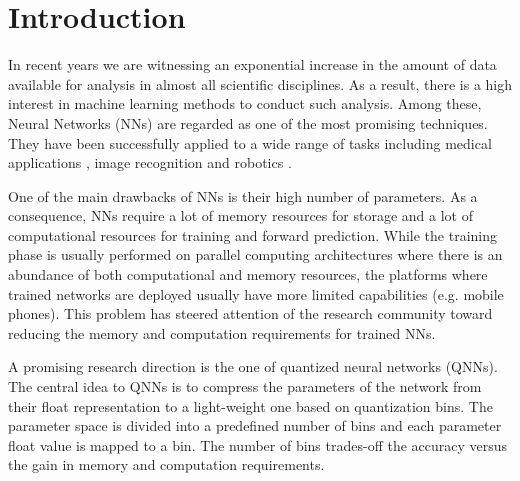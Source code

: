 
\section{Introduction}\label{sec:intro}
%
In recent years we are witnessing an exponential increase in the amount of data available for analysis in almost all scientific disciplines. As a result, there is a high interest in machine learning methods to conduct such analysis. Among these, Neural Networks (NNs) are regarded as one of the most promising techniques. 
They have been successfully applied to a wide range of tasks including medical applications \cite{amato_artificial_2013}, image recognition \cite{krizhevsky_imagenet_2012} and robotics \cite{gu_deep_2016}. 

One of the main drawbacks of NNs is their high number of parameters. As a consequence, NNs require a lot of memory resources for storage and a lot of computational resources for training and forward prediction. While the training phase is usually performed on parallel computing architectures where there is an abundance of both computational and memory resources, the platforms where  trained networks are deployed usually have more limited capabilities (e.g. mobile phones). This problem has steered attention of the research community toward reducing the memory and computation requirements for trained NNs.

A promising research direction is the one of quantized neural networks (QNNs). The central idea to QNNs is to compress the parameters of the network from their float representation to a light-weight one based on quantization bins. The parameter space is divided into a predefined number of bins and each parameter float value is mapped to a bin. The number of bins trades-off the accuracy versus the gain in memory and computation requirements. 

